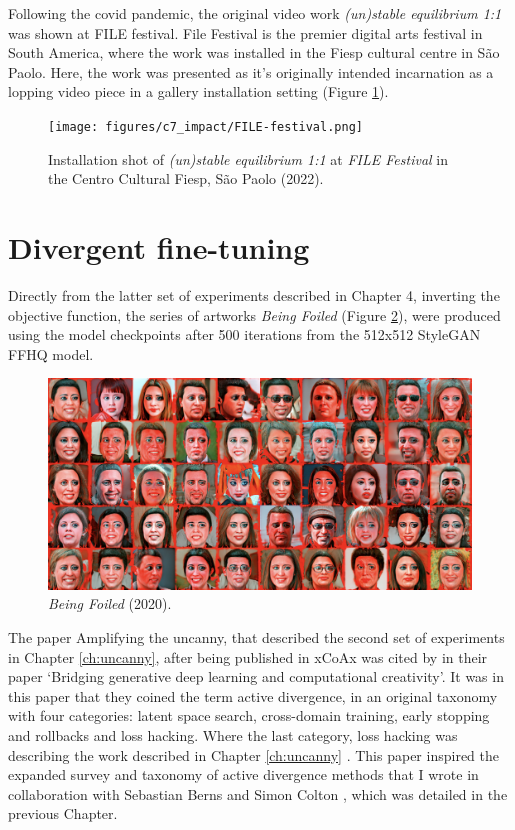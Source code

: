 Following the covid pandemic, the original video work \textit{(un)stable equilibrium 1:1} was shown at FILE festival. 
File Festival is the premier digital arts festival in South America, where the work was installed in the Fiesp cultural centre in São Paolo. 
Here, the work was presented as it’s originally intended incarnation as a lopping video piece in a gallery installation setting (Figure \ref{fig:c7:file-festival}).

\begin{figure}[!htb]
    \centering
    \captionsetup{justification=centering}
    \texttt{[image: figures/c7\_impact/FILE-festival.png]}
    \caption[Installation shot of \textit{(un)stable equilibrium} at FILE festival]{Installation shot of \textit{(un)stable equilibrium 1:1} at \textit{FILE Festival} in the Centro Cultural Fiesp, São Paolo (2022).}
    \label{fig:c7:file-festival}
\end{figure}

\section{Divergent fine-tuning}

Directly from the latter set of experiments described in Chapter 4, inverting the objective function, the series of artworks \textit{Being Foiled} (Figure \ref{fig:c7:being-foiled}), were produced using the model checkpoints after 500 iterations from the 512x512 StyleGAN FFHQ model. 

\begin{figure}[!htb]
    \centering
    \captionsetup{justification=centering}
    \includegraphics[width=1\textwidth]{figures/c7_impact/being-foiled.png}
    \caption{\textit{Being Foiled} (2020).}
    \label{fig:c7:being-foiled}
\end{figure}

The paper Amplifying the uncanny, that described the second set of experiments in Chapter \ref{ch:uncanny}, after being published in xCoAx was cited by \cite{berns2020bridging} in their paper ‘Bridging generative deep learning and computational creativity’. 
It was in this paper that they coined the term active divergence, in an original taxonomy with four categories: latent space search, cross-domain training, early stopping and rollbacks and loss hacking. 
Where the last category, loss hacking was describing the work described in Chapter \ref{ch:uncanny} . 
This paper inspired the expanded survey and taxonomy of active divergence methods that I wrote in collaboration with Sebastian Berns and Simon Colton \citep{broad2021active}, which was detailed in the previous Chapter.

